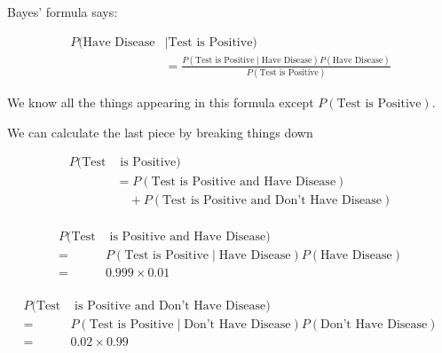 %
\begin{frame}
Bayes' formula says:

\begin{align*}
P(\text{Have Disease}  & \mid \text{Test is Positive)} \\
%
& = \frac{  P(\text{Test is
Positive} \mid \text{Have Disease}) P(\text{Have Disease}) } { P(\text{Test is
Positive}) }
\end{align*}

We know all the things appearing in this formula except $ P(\text{Test is
Positive}) $.

\end{frame}
%

%
\begin{frame}

We can calculate the last piece by breaking things down

\begin{align*}
P(\text{Test} & \text{ is Positive}) \\
%
&= P(\text{Test is Positive and Have Disease}) \\
%
& \quad + P(\text{Test is Positive and Don't Have Disease}) \\
\end{align*}

\end{frame}
%

%
\begin{frame}

\begin{align*}
P(\text{Test} & \text{ is Positive and Have Disease}) \\
%
=& P(\text{Test is Positive} \mid \text{Have Disease}) P(\text{Have Disease}) \\
=& 0.999 \times 0.01 \\
\end{align*}

\end{frame}
%

%
\begin{frame}

\begin{align*}
P(\text{Test} & \text{ is Positive and Don't Have Disease}) \\
%
=& P(\text{Test is Positive} \mid \text{Don't Have Disease}) P(\text{Don't Have Disease}) \\
=& 0.02 \times 0.99 \\
\end{align*}

\end{frame}



